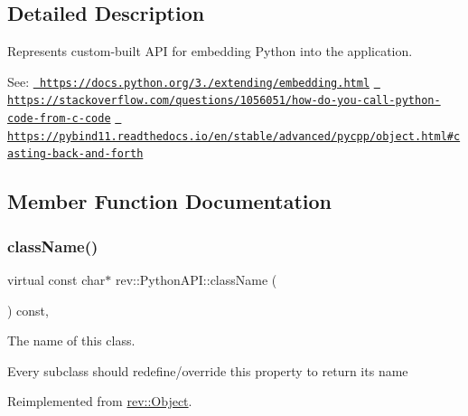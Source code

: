 \subsection{Detailed Description}
Represents custom-\/built A\+PI for embedding Python into the application. 

See\+: \href{https://docs.python.org/3.8/extending/embedding.html}{\texttt{ https\+://docs.\+python.\+org/3./extending/embedding.\+html}} \href{https://stackoverflow.com/questions/1056051/how-do-you-call-python-code-from-c-code}{\texttt{ https\+://stackoverflow.\+com/questions/1056051/how-\/do-\/you-\/call-\/python-\/code-\/from-\/c-\/code}} \href{https://pybind11.readthedocs.io/en/stable/advanced/pycpp/object.html\#casting-back-and-forth}{\texttt{ https\+://pybind11.\+readthedocs.\+io/en/stable/advanced/pycpp/object.\+html\#casting-\/back-\/and-\/forth}} 

\subsection{Member Function Documentation}
\mbox{\label{classrev_1_1_python_a_p_i_ab8d7ecd519d9d930bc7024a9e222218e}} 
\subsubsection{\texorpdfstring{className()}{className()}}
{\footnotesize\ttfamily virtual const char$\ast$ rev\+::\+Python\+A\+P\+I\+::class\+Name (\begin{DoxyParamCaption}{ }\end{DoxyParamCaption}) const\hspace{0.3cm}{\ttfamily [inline]}, {\ttfamily [virtual]}}



The name of this class. 

Every subclass should redefine/override this property to return its name 

Reimplemented from \mbox{\hyperlink{classrev_1_1_object_a7a2013f91169479b65cf93afdc5d9a68}{rev\+::\+Object}}.

\mbox{\label{classrev_1_1_python_a_p_i_a5bf04b237b6638b2b8f64c2043efb287}} 
